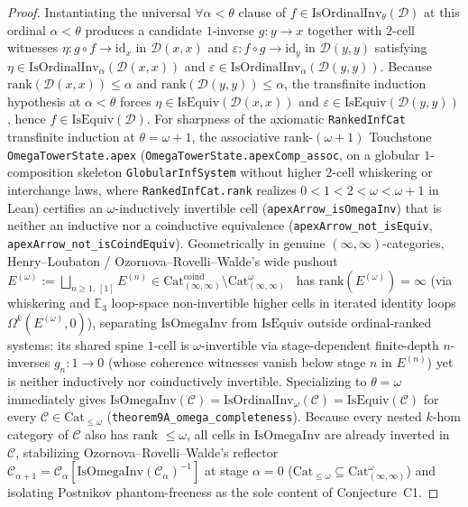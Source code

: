 \documentclass[10pt,twoside,openright]{book}
\theoremstyle{crmplain}
\theoremstyle{crmdef}
\theoremstyle{crmremark}
\begin{document}
\begin{proof}
Instantiating the universal $\forall \alpha < \theta$ clause of $f \in \mathrm{IsOrdinalInv}_\theta(\mathcal{D})$ at this ordinal $\alpha < \theta$ produces a candidate $1$-inverse $g : y \to x$ together with $2$-cell witnesses $\eta : g \circ f \to \mathrm{id}_x$ in $\mathcal{D}(x, x)$ and $\varepsilon : f \circ g \to \mathrm{id}_y$ in $\mathcal{D}(y, y)$ satisfying $\eta \in \mathrm{IsOrdinalInv}_\alpha(\mathcal{D}(x, x))$ and $\varepsilon \in \mathrm{IsOrdinalInv}_\alpha(\mathcal{D}(y, y))$. Because $\mathrm{rank}(\mathcal{D}(x, x)) \le \alpha$ and $\mathrm{rank}(\mathcal{D}(y, y)) \le \alpha$, the transfinite induction hypothesis at $\alpha < \theta$ forces $\eta \in \mathrm{IsEquiv}(\mathcal{D}(x, x))$ and $\varepsilon \in \mathrm{IsEquiv}(\mathcal{D}(y, y))$, hence $f \in \mathrm{IsEquiv}(\mathcal{D})$. For sharpness of the axiomatic \texttt{RankedInfCat} transfinite induction at $\theta = \omega + 1$, the associative rank-$(\omega + 1)$ Touchstone \texttt{OmegaTowerState.apex} (\texttt{OmegaTowerState.apexComp\_\allowbreak assoc}, on a globular $1$-composition skeleton \texttt{GlobularInfSystem} without higher $2$-cell whiskering or interchange laws, where \texttt{RankedInfCat.rank} realizes $0 < 1 < 2 < \omega < \omega + 1$ in Lean) certifies an $\omega$-inductively invertible cell (\texttt{apexArrow\_\allowbreak isOmegaInv}) that is neither an inductive nor a coinductive equivalence (\texttt{apexArrow\_\allowbreak not\_\allowbreak isEquiv}, \texttt{apexArrow\_\allowbreak not\_\allowbreak isCoindEquiv}). Geometrically in genuine $(\infty, \infty)$-categories, Henry--Loubaton / Ozornova--Rovelli--Walde's wide pushout $E^{(\omega)} := \bigsqcup_{n \ge 1,\, [1]} E^{(n)} \in \mathrm{Cat}^{\mathrm{coind}}_{(\infty, \infty)} \setminus \mathrm{Cat}^\omega_{(\infty, \infty)}$~\cite{HenryLoubaton25,ORW26} has $\mathrm{rank}(E^{(\omega)}) = \infty$ (via whiskering and $\mathbb{E}_3$ loop-space non-invertible higher cells in iterated identity loops $\Omega^k(E^{(\omega)}, 0)$), separating $\mathrm{IsOmegaInv}$ from $\mathrm{IsEquiv}$ outside ordinal-ranked systems: its shared spine $1$-cell is $\omega$-invertible via stage-dependent finite-depth $n$-inverses $g_n : 1 \to 0$ (whose coherence witnesses vanish below stage $n$ in $E^{(n)}$) yet is neither inductively nor coinductively invertible. Specializing to $\theta = \omega$ immediately gives $\mathrm{IsOmegaInv}(\mathcal{C}) = \mathrm{IsOrdinalInv}_\omega(\mathcal{C}) = \mathrm{IsEquiv}(\mathcal{C})$ for every $\mathcal{C} \in \mathrm{Cat}_{\le \omega}$ (\texttt{theorem9A\_\allowbreak omega\_\allowbreak completeness}). Because every nested $k$-hom category of $\mathcal{C}$ also has rank $\le \omega$, all cells in $\mathrm{IsOmegaInv}$ are already inverted in $\mathcal{C}$, stabilizing Ozornova--Rovelli--Walde's reflector $\mathcal{C}_{\alpha+1} = \mathcal{C}_\alpha[\mathrm{IsOmegaInv}(\mathcal{C}_\alpha)^{-1}]$ at stage $\alpha = 0$ ($\mathrm{Cat}_{\le \omega} \subseteq \mathrm{Cat}^\omega_{(\infty, \infty)}$) and isolating Postnikov phantom-freeness as the sole content of Conjecture~C1.
\end{proof}
\end{document}
